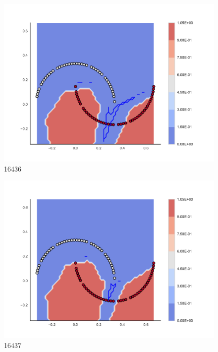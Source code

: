 \begin{subfigure}[b]{0.09\textwidth}
    \includegraphics[clip, trim=2.35cm 1.75cm 4.5cm 0cm,width=\textwidth]{img/convergence/16436.pdf}
    \caption{16436}
    \label{fig:convergence_16436}
\end{subfigure}
%
\begin{subfigure}[b]{0.09\textwidth}
    \includegraphics[clip, trim=2.35cm 1.75cm 4.5cm 0cm,width=\textwidth]{img/convergence/16437.pdf}
    \caption{16437}
    \label{fig:convergence_16437}
\end{subfigure}
%
